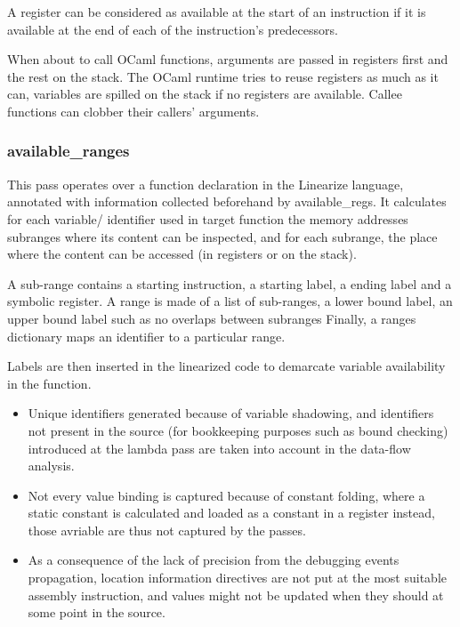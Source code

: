 A register can be considered as available at the start of an instruction
if it is available at the end of each of the instruction's predecessors.

When about to call OCaml functions, arguments are passed in registers first
and the rest on the stack.
The OCaml runtime tries to reuse registers as much as it can, variables
are spilled on the stack if no registers are available.
Callee functions can clobber their callers' arguments.

\subsubsection{available\_ranges}

This pass operates over a function declaration in the Linearize language,
annotated with information collected beforehand by available\_regs.
It calculates for each variable/ identifier used in target function the memory
addresses subranges where its content can be inspected, and for each subrange, the
place where the content can be accessed (in registers or on the stack).

A sub-range contains a starting instruction, a starting label, a ending label
and a symbolic register.
A range is made of a list of sub-ranges, a lower bound label, an upper bound label
such as no overlaps between subranges
Finally, a ranges dictionary maps an identifier to a particular range.

Labels are then inserted in the linearized code to demarcate variable availability in the
function.


\begin{itemize}
    \item Unique identifiers generated because of variable shadowing, and identifiers not present in the source (for
        bookkeeping purposes such as bound checking) introduced at the lambda pass
        are taken into account in the data-flow analysis.
    \item Not every value binding is captured because of constant folding, where a static
        constant is calculated and loaded as a constant in a register instead, those
        avriable are thus not captured by the passes.
    \item As a consequence of the lack of precision from the debugging events propagation,
        location information directives are not put at the most suitable assembly instruction,
        and values might not be updated when they should at some point in the source.
\end{itemize}

